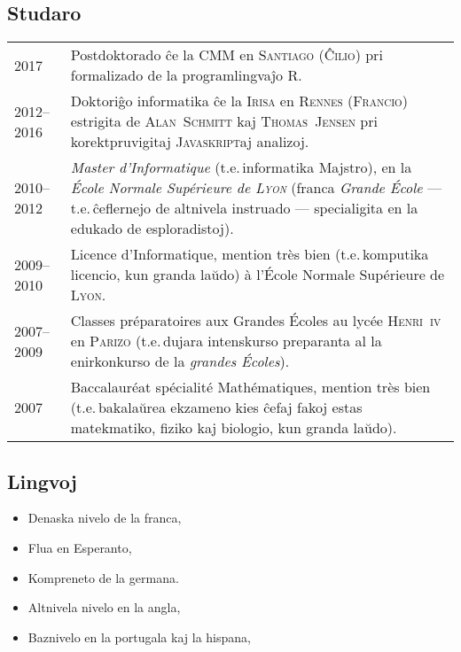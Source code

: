\documentclass[12pt,a4paper]{article}
\makeatletter
\newcommand{\fr}[1]{\foreignlanguage{francais}{\textit{#1}}}
\newcommand{\ie}{t.e.\,}
\newenvironment{datecvsection}[1]%
               {\subsection*{#1}%
                 \noindent \begin{tabular}{@{}p{\annee}p{\texte}@{}}}
               {\end{tabular}}
\newenvironment{cvsection}[1]%
               {\subsection*{#1}}
               {}
\makeatother
\begin{document}
\begin{datecvsection}{Studaro}

    2017 & Postdoktorado ĉe la \textsc{CMM} en \textsc{Santiago} (\textsc{Ĉilio}) pri formalizado de la programlingvaĵo \textsc{R}. \\

    2012–2016 & Doktoriĝo informatika ĉe la \textsc{Irisa} en \textsc{Rennes} (\textsc{Francio}) estrigita de \textsc{Alan~Schmitt} kaj \textsc{Thomas~Jensen} pri korektpruvigitaj \textsc{Javaskript}aj analizoj. \\

	2010–2012 & \fr{Master d’Informatique} (\ie informatika Majstro), en la \fr{École Normale Supérieure de \textsc{Lyon}} (franca \fr{Grande École} — \ie ĉeflernejo de altnivela instruado — specialigita en la edukado de esploradistoj). \\

    2009–2010 & Licence d’Informatique, mention très bien (\ie komputika licencio, kun granda laŭdo) à l’École Normale Supérieure de \textsc{Lyon}. \\

    2007–2009 & Classes préparatoires aux Grandes Écoles au lycée \textsc{Henri~iv} en \textsc{Parizo} (\ie dujara intenskurso preparanta al la enirkonkurso de la \fr{grandes Écoles}). \\

    2007 & Baccalauréat spécialité Mathématiques, mention très bien (\ie bakalaŭrea ekzameno kies ĉefaj fakoj estas matekmatiko, fiziko kaj biologio, kun granda laŭdo). \\

\end{datecvsection}

\begin{cvsection}{Lingvoj}
\parbox{.4\textwidth}{
\begin{itemize}
   \item Denaska nivelo de la franca,
   \item Flua en Esperanto,
   \item Kompreneto de la germana.
\end{itemize}}
\parbox{.55\textwidth}{
\begin{itemize}
   \item Altnivela nivelo en la angla,
   \item Baznivelo en la portugala kaj la hispana,
\end{itemize}}
\end{cvsection}
\end{document}
